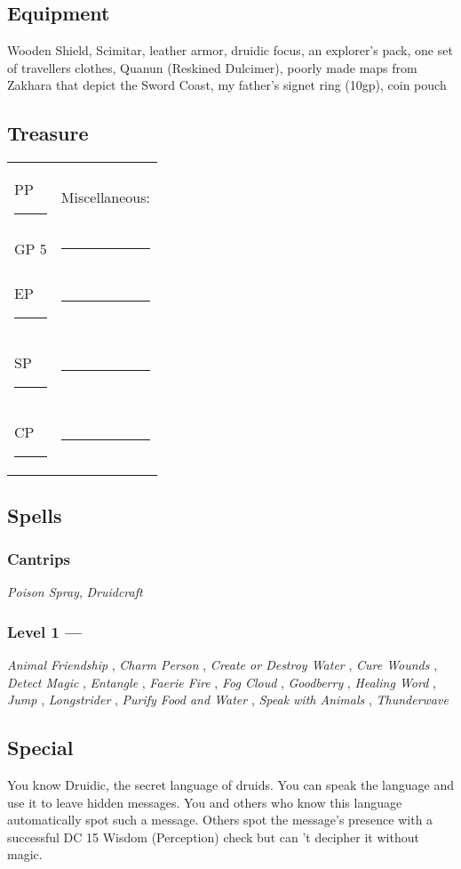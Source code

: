 \documentclass[letterpaper,10pt,twoside,twocolumn,openany]{book}
\begin{document}
\subsection{Equipment}
Wooden Shield, Scimitar, leather armor, druidic focus, an explorer's pack, one set of travellers clothes, Quanun (Reskined Dulcimer), poorly made maps from Zakhara that depict the Sword Coast, my father's signet ring (10gp), coin pouch

\subsection{Treasure}
\begin{tabular}{ll}
PP \rule{.5in}{.2pt} &Miscellaneous:\\
GP 5 &\rule{2.2in}{.2pt}\\
EP \rule{.5in}{.2pt} &\rule{2.2in}{.2pt}\\
SP \rule{.5in}{.2pt} &\rule{2.2in}{.2pt}\\
CP \rule{.5in}{.2pt} &\rule{2.2in}{.2pt}\\
\end{tabular}

\subsection{Spells}
\subsubsection{Cantrips}
\textit{Poison Spray}, \textit{Druidcraft}
\subsubsection{Level 1 --- \Circle \Circle}
\textit{Animal Friendship} \Circle, \textit{Charm Person} \Circle, \textit{Create or Destroy Water} \CIRCLE, \textit{Cure Wounds} \CIRCLE, \textit{Detect Magic} \Circle, \textit{Entangle} \CIRCLE, \textit{Faerie Fire} \Circle, \textit{Fog Cloud} \Circle, \textit{Goodberry} \Circle, \textit{Healing Word} \Circle, \textit{Jump} \Circle, \textit{Longstrider} \Circle, \textit{Purify Food and Water} \Circle, \textit{Speak with Animals} \Circle, \textit{Thunderwave} \CIRCLE

\subsection{Special}
\begin{specialability}[Druidic]
  You know Druidic, the secret language of druids. You can speak the language and use it to leave hidden messages. You and others who know this language automatically spot such a message. Others spot the message’s presence with a successful DC 15 Wisdom (Perception) check but can ’t decipher it without magic.
\end{specialability}
\end{document}
